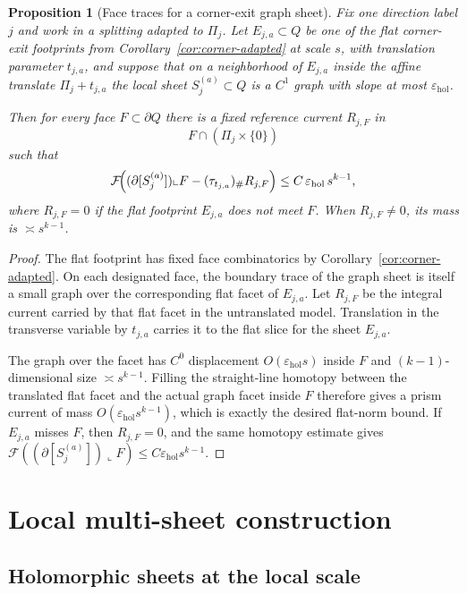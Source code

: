 \documentclass[11pt]{article}
\numberwithin{equation}{section}
\theoremstyle{plain}
\newtheorem{proposition}[theorem]{Proposition}
\theoremstyle{definition}
\theoremstyle{remark}
\newcommand{\eps}{\varepsilon}
\newcommand{\calF}{\mathcal{F}}
\begin{document}
\begin{proposition}[Face traces for a corner-exit graph sheet]\label{prop:face}
Fix one direction label $j$ and work in a splitting adapted to $\Pi_j$.  Let
$E_{j,a}\subset Q$ be one of the flat corner-exit footprints from
Corollary~\ref{cor:corner-adapted} at scale $s$, with translation parameter
$t_{j,a}$, and suppose that on a neighborhood of $E_{j,a}$ inside the affine
translate $\Pi_j+t_{j,a}$ the local sheet $S_j^{(a)}\subset Q$ is a $C^1$ graph
with slope at most $\eps_{\mathrm{hol}}$.

Then for every face $F\subset \partial Q$ there is a fixed reference current $R_{j,F}$ in
\[
F \cap (\Pi_j\times\{0\})
\]
such that
\[
\calF\!\Bigl((\partial [S_j^{(a)}])\llcorner F-(\tau_{t_{j,a}})_\#R_{j,F}\Bigr)
\le C\,\eps_{\mathrm{hol}}\,s^{k-1},
\]
where $R_{j,F}=0$ if the flat footprint $E_{j,a}$ does not meet $F$.  When
$R_{j,F}\neq 0$, its mass is $\asymp s^{k-1}$.
\end{proposition}

\begin{proof}
The flat footprint has fixed face combinatorics by
Corollary~\ref{cor:corner-adapted}.  On each designated face, the boundary trace
of the graph sheet is itself a small graph over the corresponding flat facet of
$E_{j,a}$.  Let $R_{j,F}$ be the integral current carried by that flat facet in
the untranslated model.  Translation in the transverse variable by $t_{j,a}$
carries it to the flat slice for the sheet $E_{j,a}$.

The graph over the facet has $C^0$ displacement $O(\eps_{\mathrm{hol}}s)$ inside
$F$ and $(k-1)$-dimensional size $\asymp s^{k-1}$.  Filling the straight-line
homotopy between the translated flat facet and the actual graph facet inside $F$
therefore gives a prism current of mass $O(\eps_{\mathrm{hol}}s^{k-1})$, which
is exactly the desired flat-norm bound.  If $E_{j,a}$ misses $F$, then
$R_{j,F}=0$, and the same homotopy estimate gives
$\calF((\partial [S_j^{(a)}])\llcorner F)\le C\eps_{\mathrm{hol}}s^{k-1}$.
\end{proof}

\section{Local multi-sheet construction}

\subsection{Holomorphic sheets at the local scale}
\end{document}
